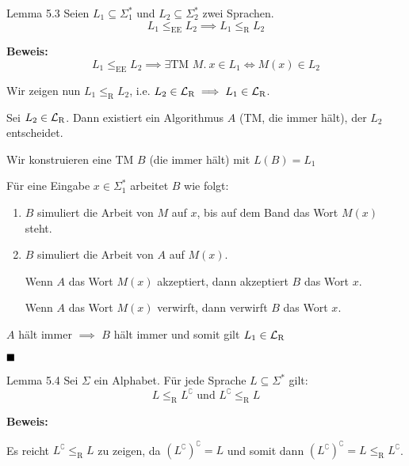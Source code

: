         
        
            \begin{mainbox}{Lemma 5.3}
                Seien $L_1 \subseteq \Sigma_{1}^*$ und $L_2 \subseteq \Sigma_{2}^*$ zwei Sprachen.
                $$L_1 \leq_{\text{EE}} L_2 \implies L_1 \leq_{\text{R}} L_2$$
            \end{mainbox}
            \textbf{Beweis: }
            $$L_1 \leq_{\text{EE}} L_2 \implies \exists \text{TM } M. \ x \in L_1 \iff M(x) \in L_2$$
        
            Wir zeigen nun $L_1 \leq_{\text{R}} L_2$, i.e. $L_2 \in \mathcal{L}_\text{R} \implies L_1 \in \mathcal{L}_\text{R}$.
        
            Sei $L_2 \in \mathcal{L}_\text{R}$. Dann existiert ein Algorithmus $A$ (TM, die immer hält), der $L_2$ entscheidet.

            Wir konstruieren eine TM $B$ (die immer hält) mit $L(B) = L_1$
        
            Für eine Eingabe $x \in \Sigma_1^*$ arbeitet $B$ wie folgt:
            \begin{enumerate}[label=(\roman*)]
                \item $B$ simuliert die Arbeit von $M$ auf $x$, bis auf dem Band das Wort $M(x)$ steht.
                \item $B$ simuliert die Arbeit von $A$ auf $M(x)$.
                
                Wenn $A$ das Wort $M(x)$ akzeptiert, dann akzeptiert $B$ das Wort $x$.
        
                Wenn $A$ das Wort $M(x)$ verwirft, dann verwirft $B$ das Wort $x$.
            \end{enumerate}
            $A$ hält immer $\implies$ $B$ hält immer und somit gilt $L_1 \in \mathcal{L}_\text{R}$  
        
            $\hfill\blacksquare$
        
        
        

            \begin{mainbox}{Lemma 5.4}
                Sei $\Sigma$ ein Alphabet. Für jede Sprache $L \subseteq \Sigma^*$ gilt:
             $$L \leq_\text{R} L^\complement \text{ und } L^\complement \leq_\text{R} L$$
            \end{mainbox}
            \textbf{Beweis: }
        
            Es reicht $L^\complement \leq_\text{R} L$ zu zeigen, da $(L^\complement)^\complement = L$ und somit dann $(L^\complement)^\complement = L \leq_\text{R} L^\complement$.
        
